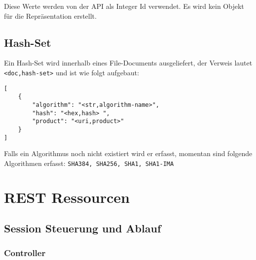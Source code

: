 \documentclass[10pt,a4paper]{scrartcl}
\begin{document}
Diese Werte werden von der API als Integer Id verwendet. Es wird kein Objekt für
die Repräsentation erstellt.

\subsection{Hash-Set}
Ein Hash-Set wird innerhalb eines File-Documents ausgeliefert, der Verweis lautet \texttt{<doc,hash-set>} und ist wie folgt aufgebaut:

\begin{lstlisting}
[
	{
		"algorithm": "<str,algorithm-name>",
		"hash": "<hex,hash>	",
		"product": "<uri,product>"
	}
]
\end{lstlisting}

Falls ein Algorithmus noch nicht existiert wird er erfasst, momentan sind folgende Algorithmen erfasst: 
\texttt{SHA384, SHA256, SHA1, SHA1-IMA}


\pagebreak


\section{REST Ressourcen}

\subsection{Session Steuerung und Ablauf}

\subsubsection{Controller}
\end{document}
